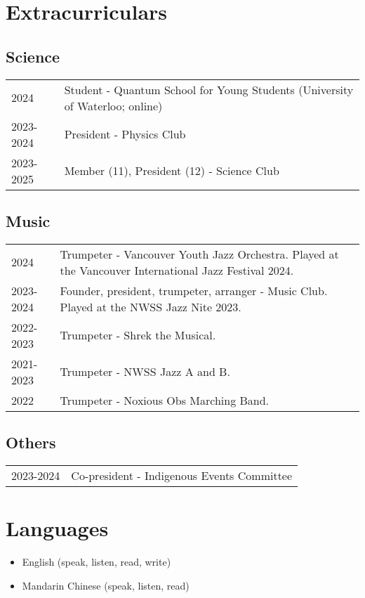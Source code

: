 \documentclass{article}
\begin{document}
\section*{Extracurriculars}

\subsection*{Science}

\begin{tabular}{@{}ll}
	2024      & Student - Quantum School for Young Students (University of Waterloo; online) \\
	2023-2024 & President - Physics Club                                                     \\
	2023-2025 & Member (11), President (12) - Science Club
\end{tabular}

\subsection*{Music}

\begin{tabular}{@{}ll}
	2024      & Trumpeter - Vancouver Youth Jazz Orchestra. Played at the Vancouver International Jazz Festival 2024. \\
	2023-2024 & Founder, president, trumpeter, arranger - Music Club. Played at the NWSS Jazz Nite 2023.              \\
	2022-2023 & Trumpeter - Shrek the Musical.                                                                        \\
	2021-2023 & Trumpeter - NWSS Jazz A and B.                                                                        \\
	2022      & Trumpeter - Noxious Obs Marching Band.
\end{tabular}

\subsection*{Others}

\begin{tabular}{@{}ll}
	2023-2024 & Co-president - Indigenous Events Committee
\end{tabular}

\section*{Languages}

\begin{itemize}
	\item English (speak, listen, read, write)
	\item Mandarin Chinese (speak, listen, read)
\end{itemize}
\end{document}
